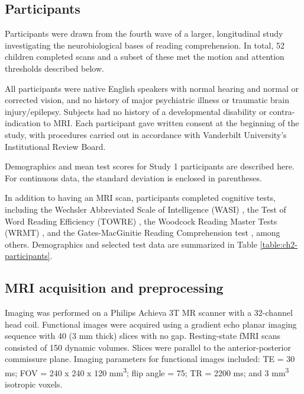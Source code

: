 \subsection{Participants}

Participants were drawn from the fourth wave of a larger, longitudinal study investigating the neurobiological bases of reading comprehension. In total, 52 children completed scans and a subset of these met the motion and attention thresholds described below.

All participants were native English speakers with normal hearing and normal or corrected vision, and no history of major psychiatric illness or traumatic brain injury/epilepsy. Subjects had no history of a developmental disability or contra-indication to MRI.  Each participant gave written consent at the beginning of the study, with procedures carried out in accordance with Vanderbilt University’s Institutional Review Board.

\begin{table}
    \renewcommand{\tabcolsep}{0.09cm}
    \centering
    
    \caption[Participant demographics]{Demographics and mean test scores for Study 1 participants are described here. For continuous data, the standard deviation is enclosed in parentheses.}
    \label{table:ch2-participants}
\end{table}

In addition to having an MRI scan, participants completed cognitive tests, including the Wechsler Abbreviated Scale of Intelligence (WASI) \citep{Kaplan1999}, the Test of Word Reading Efficiency (TOWRE) \citep{Torgesen2012}, the Woodcock Reading Master Tests (WRMT) \citep{Woodcock1998}, and the Gates-MacGinitie Reading Comprehension test \citep{MacGinitie2000}, among others. Demographics and selected test data are summarized in Table \ref{table:ch2-participants}.

\subsection{MRI acquisition and preprocessing}

Imaging was performed on a Philips Achieva 3T MR scanner with a 32-channel head coil. Functional images were acquired using a gradient echo planar imaging sequence with 40 (3 mm thick) slices with no gap. Resting-state fMRI scans consisted of 150 dynamic volumes. Slices were parallel to the anterior-posterior commissure plane. Imaging parameters for functional images included: TE = 30 ms; FOV = 240 x 240 x 120 mm\textsuperscript{3}; flip angle = 75\degree; TR = 2200 ms; and 3 mm\textsuperscript{3} isotropic voxels.

